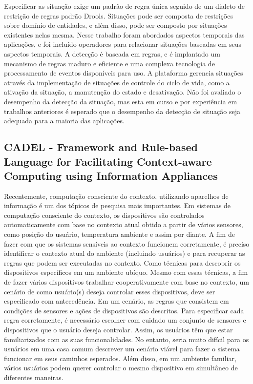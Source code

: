 \documentclass[12pt,a4paper,compsoc]{IEEEtran}
\begin{document}
  Especificar as situação exige um padrão de regra única seguido de um dialeto de restrição de
  regras padrão Drools. Situações pode ser composta de restrições sobre domínio de entidades, e
  além disso, pode ser composto por situações existentes nelas mesma. Nesse trabalho foram
  abordados aspectos temporais das aplicações, e foi incluído operadores para relacionar situações
  baseadas em seus aspectos temporais. A detecção é baseada em regras, e é implantado um mecanismo
  de regras maduro e eficiente e uma complexa tecnologia de processamento de eventos disponíveis
  para uso. A plataforma gerencia situações através da implementação de situações de controle do
  ciclo de vida, como a ativação da situação, a manutenção do estado e desativação. Não foi
  avaliado o desempenho da detecção da situação, mas esta em curso e por experiência em trabalhos
  anteriores é esperado que o desempenho da detecção de situação seja adequada para a maioria das
  aplicações.


\subsection{CADEL - Framework and Rule-based Language for Facilitating Context-aware Computing
 using Information Appliances}

  Recentemente, computação consciente do contexto, utilizando aparelhos de informação é um dos
  tópicos de pesquisa mais importantes. Em sistemas de computação consciente do contexto, os
  dispositivos são controlados automaticamente com base no contexto atual obtido a partir de vários
  sensores, como posição do usuário, temperatura ambiente e assim por diante. A fim de fazer com
  que os sistemas sensíveis ao contexto funcionem corretamente, é preciso identificar o contexto
  atual do ambiente (incluindo usuários) e para recuperar as regras que podem ser executadas no
  contexto. Como técnicas para descobrir os dispositivos específicos em um ambiente ubíquo. Mesmo
  com essas técnicas, a fim de fazer vários dispositivos trabalhar cooperativamente com base no
  contexto, um cenário de como usuário(s) deseja controlar esses dispositivos, deve ser
  especificado com antecedência. Em um cenário, as regras que consistem em condições de sensores e
  ações de dispositivos são descritos. Para especificar cada regra corretamente, é necessário
  escolher com cuidado um conjunto de sensores e dispositivos que o usuário deseja controlar.
  Assim, os usuários têm que estar familiarizados com as suas funcionalidades. No entanto, seria
  muito difícil para os usuários em uma casa comum descrever um cenário viável para fazer o sistema
  funcionar em seus caminhos esperados. Além disso, em um ambiente familiar, vários usuários podem
  querer controlar o mesmo dispositivo em simultâneo de diferentes maneiras.
  
\end{document}
